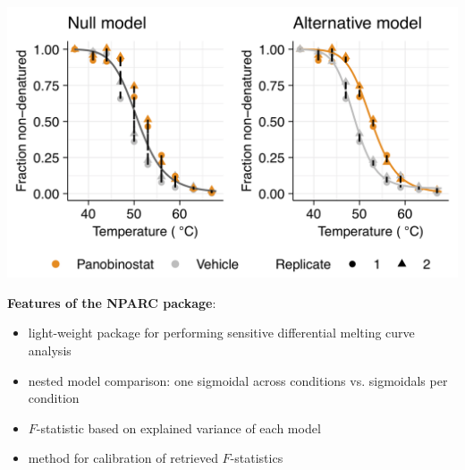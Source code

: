 \documentclass{article}
\newcommand{\hcode}[2][lgray]{{\ttfamily\color{vdgray}\colorbox{#1}{#2}}}
\begin{document}
\begin{multicols}{2}
\begin{minipage}[t]{\linewidth}
  \begin{minipage}{0.6\linewidth}
  \includegraphics[width=\linewidth]{figs/nparc-tr_example_new.png}
  \end{minipage}%
  \begin{minipage}{0.4\linewidth}
  \textbf{Features of the \hcode{NPARC} package}:
% 
  \begin{itemize}
%
  \item light-weight package for performing sensitive differential melting curve analysis
  \item nested model comparison: one sigmoidal across conditions vs. sigmoidals per condition
  \item $F$-statistic based on explained variance of each model
  \item method for calibration of retrieved $F$-statistics
%
  \end{itemize}
  \end{minipage}
\end{minipage}


\noindent
\begin{minipage}[t]{\linewidth}
  \vspace{0.55cm}

\end{minipage}
\end{multicols}
\end{document}
